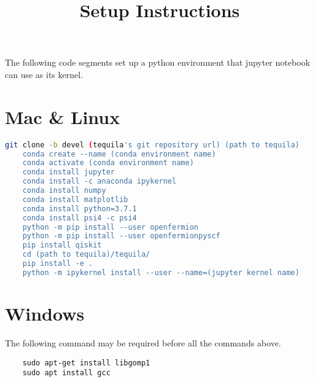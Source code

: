 \documentclass[12pt]{article}
\title{Setup Instructions}
\date{}
\begin{document}
\maketitle

The following code segments set up a python environment that jupyter notebook can use as its kernel. 

\section*{Mac \& Linux}

\begin{lstlisting}[language=bash, breaklines=true]
    git clone -b devel (tequila's git repository url) (path to tequila)
    conda create --name (conda environment name)
    conda activate (conda environment name)
    conda install jupyter
    conda install -c anaconda ipykernel
    conda install numpy
    conda install matplotlib
    conda install python=3.7.1
    conda install psi4 -c psi4
    python -m pip install --user openfermion
    python -m pip install --user openfermionpyscf
    pip install qiskit
    cd (path to tequila)/tequila/
    pip install -e .
    python -m ipykernel install --user --name=(jupyter kernel name)
\end{lstlisting}

\section*{Windows}
The following command may be required before all the commands above. 
\begin{lstlisting}
    sudo apt-get install libgomp1
    sudo apt install gcc
\end{lstlisting}
\end{document}
